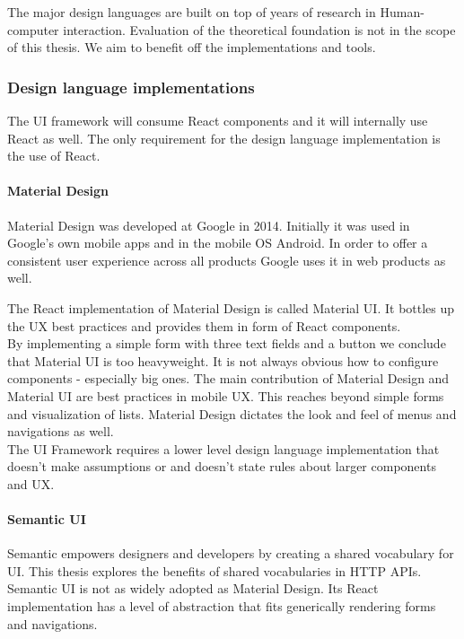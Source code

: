 The major design languages are built on top of years of research in Human-computer interaction. Evaluation of the theoretical foundation is not in the scope of this thesis. We aim to benefit off the implementations and tools.

\subsubsection{Design language implementations}
The UI framework will consume React components and it will internally use React as well. The only requirement for the design language implementation is the use of React.

\paragraph{Material Design}
Material Design was developed at Google in 2014. Initially it was used in Google's own mobile apps and in the mobile OS Android. In order to offer a consistent user experience across all products Google uses it in web products as well.

The React implementation of Material Design is called Material UI. It bottles up the UX best practices and provides them in form of React components. \\
By implementing a simple form with three text fields and a button we conclude that Material UI is too heavyweight. It is not always obvious how to configure components - especially big ones. The main contribution of Material Design and Material UI are best practices in mobile UX. This reaches beyond simple forms and visualization of lists. Material Design dictates the look and feel of menus and navigations as well. \\
The UI Framework requires a lower level design language implementation that doesn't make assumptions or and doesn't state rules about larger components and UX.

\paragraph{Semantic UI}
Semantic empowers designers and developers by creating a shared vocabulary for UI. \citep{semanticui} This thesis explores the benefits of shared vocabularies in HTTP APIs. Semantic UI is not as widely adopted as Material Design. Its React implementation has a level of abstraction that fits generically rendering forms and navigations.

